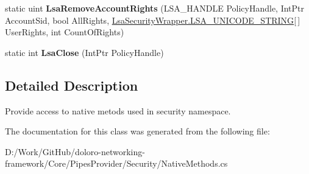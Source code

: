 \begin{DoxyCompactItemize}
\item 
\mbox{\label{class_pipes_provider_1_1_security_1_1_native_methods_acf4899aa118ee28b7ea34a51af41a371}} 
static uint {\bfseries Lsa\+Remove\+Account\+Rights} (L\+S\+A\+\_\+\+H\+A\+N\+D\+LE Policy\+Handle, Int\+Ptr Account\+Sid, bool All\+Rights, \mbox{\hyperlink{struct_pipes_provider_1_1_security_1_1_l_s_a_1_1_lsa_security_wrapper_1_1_l_s_a___u_n_i_c_o_d_e___s_t_r_i_n_g}{Lsa\+Security\+Wrapper.\+L\+S\+A\+\_\+\+U\+N\+I\+C\+O\+D\+E\+\_\+\+S\+T\+R\+I\+NG}}\mbox{[}$\,$\mbox{]} User\+Rights, int Count\+Of\+Rights)
\item 
\mbox{\label{class_pipes_provider_1_1_security_1_1_native_methods_ab24dd1a3005b9e4738c8a71b942e682a}} 
static int {\bfseries Lsa\+Close} (Int\+Ptr Policy\+Handle)
\end{DoxyCompactItemize}


\subsection{Detailed Description}
Provide access to native metods used in security namespace. 



The documentation for this class was generated from the following file\+:\begin{DoxyCompactItemize}
\item 
D\+:/\+Work/\+Git\+Hub/doloro-\/networking-\/framework/\+Core/\+Pipes\+Provider/\+Security/Native\+Methods.\+cs\end{DoxyCompactItemize}
